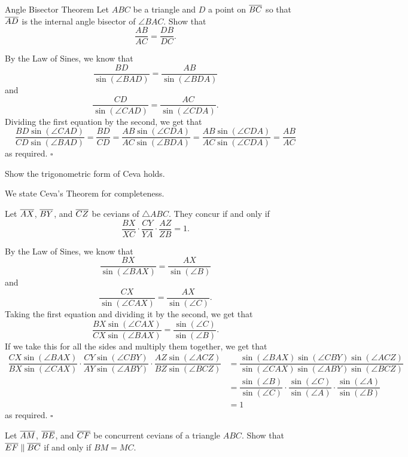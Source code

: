 \documentclass{article}
\begin{document}
\begin{problem}[3.2]{Angle Bisector Theorem}
Let $ABC$ be a triangle and $D$ a point on $\overline{BC}$ so that $\overline{AD}$ is the internal angle bisector of $\angle BAC$. Show that \[\dfrac{AB}{AC} = \dfrac{DB}{DC}.\]
\end{problem}

By the Law of Sines, we know that \[\dfrac{BD}{\sin(\angle BAD)} = \dfrac{AB}{\sin(\angle BDA)}\] and \[\dfrac{CD}{\sin(\angle CAD)} = \dfrac{AC}{\sin(\angle CDA)}.\] Dividing the first equation by the second, we get that \[\dfrac{BD\sin(\angle CAD)}{CD\sin(\angle BAD)}=\dfrac{BD}{CD} = \dfrac{AB\sin(\angle CDA)}{AC\sin(\angle BDA)} = \dfrac{AB\sin(\angle CDA)}{AC\sin(\angle CDA)} = \dfrac{AB}{AC}\] as required. $\square$

\begin{problem}[3.5]{}
Show the trigonometric form of Ceva holds.
\end{problem}

We state Ceva's Theorem for completeness.
\begin{theorem*}
Let $\overline{AX}$, $\overline{BY}$, and $\overline{CZ}$ be cevians of $\triangle ABC$. They concur if and only if \[\dfrac{BX}{XC}\cdot\dfrac{CY}{YA}\cdot\dfrac{AZ}{ZB} = 1.\]
\end{theorem*}
By the Law of Sines, we know that \[\dfrac{BX}{\sin(\angle BAX)} = \dfrac{AX}{\sin(\angle B)}\] and \[\dfrac{CX}{\sin(\angle CAX)} = \dfrac{AX}{\sin(\angle C)}.\] Taking the first equation and dividing it by the second, we get that \[\dfrac{BX\sin(\angle CAX)}{CX\sin(\angle BAX)} = \dfrac{\sin(\angle C)}{\sin(\angle B)}.\] If we take this for all the sides and multiply them together, we get that 
\begin{align*}
\dfrac{CX\sin(\angle BAX)}{BX\sin(\angle CAX)}\cdot\dfrac{CY\sin(\angle CBY)}{AY\sin(\angle ABY)}\cdot\dfrac{AZ\sin(\angle ACZ)}{BZ\sin(\angle BCZ)} &= \dfrac{\sin(\angle BAX)\sin(\angle CBY)\sin(\angle ACZ)}{\sin(\angle CAX)\sin(\angle ABY)\sin(\angle BCZ)} \\
&=  \dfrac{\sin(\angle B)}{\sin(\angle C)}\cdot \dfrac{\sin(\angle C)}{\sin(\angle A)}\cdot\dfrac{\sin(\angle A)}{\sin(\angle B)} \\
&= 1
\end{align*}
as required. $\square$

\begin{problem}[3.6]{}
Let $\overline{AM}$, $\overline{BE}$, and $\overline{CF}$ be concurrent cevians of a triangle $ABC$. Show that $\overline{EF}\parallel\overline{BC}$ if and only if $BM=MC$.
\end{problem}
\end{document}
